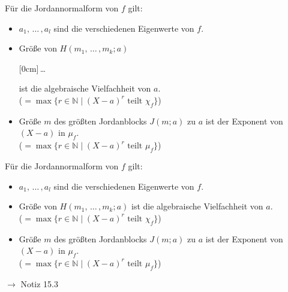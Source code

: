 \documentclass[11pt]{article}
\renewcommand{\cite}[1]{\par\bigskip\hfill{\color{gray}\tiny\(\to\) #1}}
\newcommand{\NN}{\mathbb{N}}
\newcommand{\hide}[1]{\parbox{0cm}{\raisebox{-7pt}[0cm]{\dots}}\color{white}#1\color{black}}
\let\olddots\dots
\renewcommand{\dots}{\,\olddots\,}
\newenvironment{field}{}{\newpage}
\newif\ifnote
\newenvironment{note}{\notetrue}{\notefalse}
\begin{document}
\begin{note}
    \begin{field}
        Für die Jordannormalform von $f$ gilt:
        \begin{itemize}
            \item $a_1,\dots,a_l$ sind die verschiedenen Eigenwerte von $f$.
            \item Größe von $H(m_1,\dots,m_k;a)$ \hide{ist die algebraische Vielfachheit von $a$.\\
            ($= \max\{r\in \NN \mid (X-a)^r \text{ teilt } \chi_f\}$)}
            \item Größe $m$ des größten Jordanblocks $J(m;a)$ zu $a$ ist der Exponent von $(X-a)$ in $\mu_f$.\\
            ($= \max\{r\in \NN \mid (X-a)^r \text{ teilt } \mu_f\}$)
        \end{itemize}
    \end{field}
    \begin{field}
        Für die Jordannormalform von $f$ gilt:
        \begin{itemize}
            \item $a_1,\dots,a_l$ sind die verschiedenen Eigenwerte von $f$.
            \item Größe von $H(m_1,\dots,m_k;a)$ ist die algebraische Vielfachheit von $a$.\\
            ($= \max\{r\in \NN \mid (X-a)^r \text{ teilt } \chi_f\}$)
            \item Größe $m$ des größten Jordanblocks $J(m;a)$ zu $a$ ist der Exponent von $(X-a)$ in $\mu_f$.\\
            ($= \max\{r\in \NN \mid (X-a)^r \text{ teilt } \mu_f\}$)
        \end{itemize}
        \cite{Notiz 15.3}
    \end{field}


\end{note}
\end{document}
